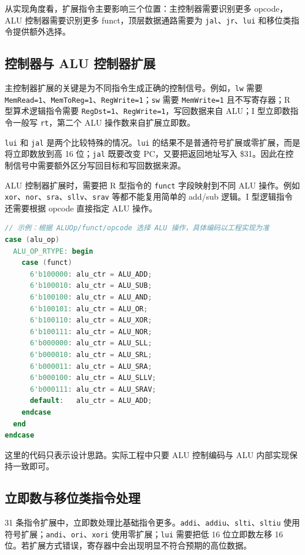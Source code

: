 \documentclass[UTF8,zihao=-4]{ctexart}
\begin{document}
从实现角度看，扩展指令主要影响三个位置：主控制器需要识别更多 opcode，ALU 控制器需要识别更多 funct，顶层数据通路需要为 \texttt{jal}、\texttt{jr}、\texttt{lui} 和移位类指令提供额外选择。

\subsection{控制器与 ALU 控制器扩展}

主控制器扩展的关键是为不同指令生成正确的控制信号。例如，\texttt{lw} 需要 \texttt{MemRead=1}、\texttt{MemToReg=1}、\texttt{RegWrite=1}；\texttt{sw} 需要 \texttt{MemWrite=1} 且不写寄存器；R 型算术逻辑指令需要 \texttt{RegDst=1}、\texttt{RegWrite=1}，写回数据来自 ALU；I 型立即数指令一般写 \texttt{rt}，第二个 ALU 操作数来自扩展立即数。

\texttt{lui} 和 \texttt{jal} 是两个比较特殊的情况。\texttt{lui} 的结果不是普通符号扩展或零扩展，而是将立即数放到高 16 位；\texttt{jal} 既要改变 PC，又要把返回地址写入 \$31。因此在控制信号中需要额外区分写回目标和写回数据来源。

ALU 控制器扩展时，需要把 R 型指令的 \texttt{funct} 字段映射到不同 ALU 操作。例如 \texttt{xor}、\texttt{nor}、\texttt{sra}、\texttt{sllv}、\texttt{srav} 等都不能复用简单的 add/sub 逻辑。I 型逻辑指令还需要根据 opcode 直接指定 ALU 操作。

\begin{lstlisting}[language=Verilog]
// 示例：根据 ALUOp/funct/opcode 选择 ALU 操作，具体编码以工程实现为准
case (alu_op)
  ALU_OP_RTYPE: begin
    case (funct)
      6'b100000: alu_ctr = ALU_ADD;
      6'b100010: alu_ctr = ALU_SUB;
      6'b100100: alu_ctr = ALU_AND;
      6'b100101: alu_ctr = ALU_OR;
      6'b100110: alu_ctr = ALU_XOR;
      6'b100111: alu_ctr = ALU_NOR;
      6'b000000: alu_ctr = ALU_SLL;
      6'b000010: alu_ctr = ALU_SRL;
      6'b000011: alu_ctr = ALU_SRA;
      6'b000100: alu_ctr = ALU_SLLV;
      6'b000111: alu_ctr = ALU_SRAV;
      default:   alu_ctr = ALU_ADD;
    endcase
  end
endcase
\end{lstlisting}

这里的代码只表示设计思路。实际工程中只要 ALU 控制编码与 ALU 内部实现保持一致即可。

\subsection{立即数与移位类指令处理}

31 条指令扩展中，立即数处理比基础指令更多。\texttt{addi}、\texttt{addiu}、\texttt{slti}、\texttt{sltiu} 使用符号扩展；\texttt{andi}、\texttt{ori}、\texttt{xori} 使用零扩展；\texttt{lui} 需要把低 16 位立即数左移 16 位。若扩展方式错误，寄存器中会出现明显不符合预期的高位数据。
\end{document}
